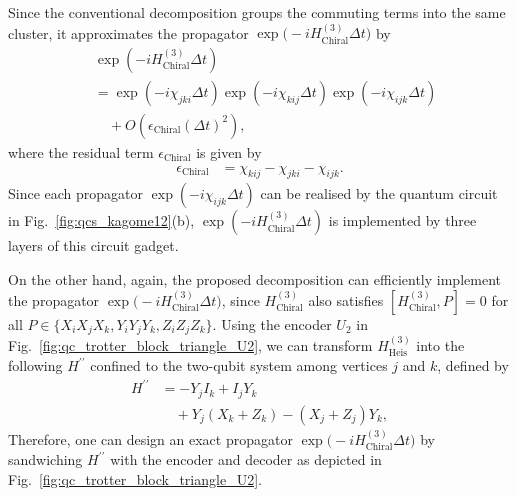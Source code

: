\documentclass[aps,showpacs,amsmath,amssymb,twocolumn,prx,longbibliography,superscriptaddress,notitlepage,floatfix,10pt]{revtex4-2}
\begin{document}
Since the conventional decomposition groups the commuting terms into the same cluster, it approximates the propagator $\exp\bigl(-iH_{\mathrm{Chiral}}^{(3)}\Delta t\bigr)$ by 
\begin{equation}\label{eq:convdecomp_Hcluster2}
    \begin{split}
        &\exp\left(-iH_{\mathrm{Chiral}}^{(3)}\Delta t\right) \\
        &= \exp\left(-i\chi_{jki}\Delta t\right)
            \exp\left(-i \chi_{kij}\Delta t\right)
            \exp\left(-i\chi_{ijk}\Delta t\right) \\
        &\quad+ O(\epsilon_{\mathrm{Chiral}}(\Delta t)^{2}),
    \end{split}
\end{equation}
where the residual term $\epsilon_{\mathrm{Chiral}}$ is given by
\begin{equation}\label{eq:epsilon_2}
\begin{split}
    \epsilon_{\mathrm{Chiral}}
    &=\chi_{kij}-\chi_{jki}-\chi_{ijk}.
\end{split}
\end{equation}
Since each propagator $\exp\left(-i\chi_{ijk}\Delta t\right)$ can be realised by the quantum circuit in Fig.~\ref{fig:qcs_kagome12}(b), $\exp\left(-iH_{\mathrm{Chiral}}^{(3)}\Delta t\right)$ is implemented by three layers of this circuit gadget.

On the other hand, again, the proposed decomposition can efficiently implement the propagator $\exp\bigl(-iH_{\mathrm{Chiral}}^{(3)}\Delta t\bigr)$, since $H_{\mathrm{Chiral}}^{(3)}$ also satisfies $[H_{\mathrm{Chiral}}^{(3)}, P]=0$ for all $P\in\{X_{i}X_{j}X_{k}, Y_{i}Y_{j}Y_{k}, Z_{i}Z_{j}Z_{k}\}$.
Using the encoder $U_{2}$ in Fig.~\ref{fig:qc_trotter_block_triangle_U2}, we can transform $H_{\mathrm{Heis}}^{(3)}$ into the following $H^{\prime\prime}$ confined to the two-qubit system among vertices $j$ and $k$, defined by
\begin{equation}
\begin{split}
    H^{\prime\prime}
    &= -Y_{j} I_{k}+I_{j}Y_{k} \\
    &\quad +Y_{j} (X_{k}+Z_{k})-(X_{j}+Z_{j})Y_{k},
\end{split}
\end{equation}
Therefore, one can design an exact propagator $\exp\bigl(-iH_{\mathrm{Chiral}}^{(3)}\Delta t\bigr)$ by sandwiching $H^{\prime\prime}$ with the encoder and decoder as depicted in Fig.~\ref{fig:qc_trotter_block_triangle_U2}.
\end{document}
